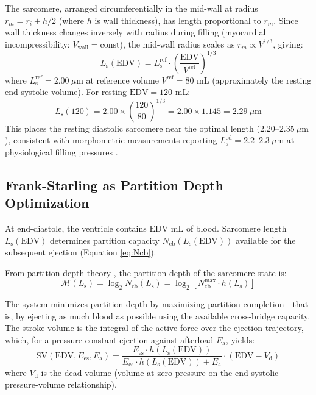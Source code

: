 \documentclass[10pt,twocolumn,a4paper]{article}
\theoremstyle{remark}
\newcommand{\Ees}{E_{\mathrm{es}}}
\newcommand{\Ea}{E_{\mathrm{a}}}
\newcommand{\Vd}{V_{\mathrm{d}}}
\newcommand{\SV}{\mathrm{SV}}
\newcommand{\EDV}{\mathrm{EDV}}
\newcommand{\Ncb}{N_{\mathrm{cb}}}
\newcommand{\Ls}{L_{\mathrm{s}}}
\begin{document}
The sarcomere, arranged circumferentially in the mid-wall at radius $r_m = r_i + h/2$ (where $h$ is wall thickness), has length proportional to $r_m$. Since wall thickness changes inversely with radius during filling (myocardial incompressibility: $V_{\mathrm{wall}} = \mathrm{const}$), the mid-wall radius scales as $r_m \propto V^{1/3}$, giving:
\begin{equation}
    \Ls(\EDV) = \Ls^{\mathrm{ref}} \cdot \left(\frac{\EDV}{V^{\mathrm{ref}}}\right)^{1/3}
    \label{eq:Ls_EDV}
\end{equation}
where $\Ls^{\mathrm{ref}} = 2.00~\mu\mathrm{m}$ at reference volume $V^{\mathrm{ref}} = 80$ mL (approximately the resting end-systolic volume). For resting $\EDV = 120$ mL:
\begin{equation}
    \Ls(120) = 2.00 \times \left(\frac{120}{80}\right)^{1/3} = 2.00 \times 1.145 = 2.29~\mu\mathrm{m}
\end{equation}
This places the resting diastolic sarcomere near the optimal length ($2.20$--$2.35~\mu\mathrm{m}$), consistent with morphometric measurements reporting $\Ls^{\mathrm{ed}} = 2.2$--$2.3~\mu\mathrm{m}$ at physiological filling pressures \cite{rodriguez1992stress}.

\subsection{Frank-Starling as Partition Depth Optimization}

At end-diastole, the ventricle contains $\EDV$ mL of blood. Sarcomere length $\Ls(\EDV)$ determines partition capacity $\Ncb(\Ls(\EDV))$ available for the subsequent ejection (Equation \ref{eq:Ncb}).

From partition depth theory \cite{sachikonye2024gas}, the partition depth of the sarcomere state is:
\begin{equation}
    \mathcal{M}(\Ls) = \log_2 \Ncb(\Ls) = \log_2[\Ncb^{\max} \cdot h(\Ls)]
\end{equation}

The system minimizes partition depth by maximizing partition completion—that is, by ejecting as much blood as possible using the available cross-bridge capacity. The stroke volume is the integral of the active force over the ejection trajectory, which, for a pressure-constant ejection against afterload $\Ea$, yields:
\begin{equation}
    \SV(\EDV, \Ees, \Ea) = \frac{\Ees \cdot h(\Ls(\EDV))}{\Ees \cdot h(\Ls(\EDV)) + \Ea} \cdot (\EDV - \Vd)
    \label{eq:frank_starling}
\end{equation}
where $\Vd$ is the dead volume (volume at zero pressure on the end-systolic pressure-volume relationship).
\end{document}
